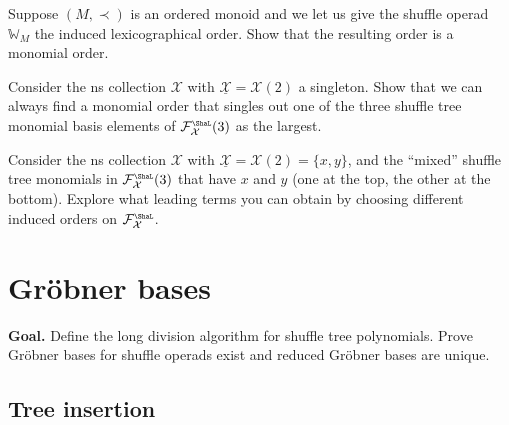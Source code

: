 \documentclass[fleqn, a4paper, twoside]{article}
\newcommand{\Sha}{{\scaleobj{0.75}{\ShaL}}}
\newcommand{\0}{\langle 0\rangle}
\newcommand{\XX}{\mathcal{X}}
\newcommand{\FF}{\mathcal{F}}
\DeclareRobustCommand{\[}{\begin{equation}}%
\DeclareRobustCommand{\]}{\end{equation}}%
\theoremstyle{mytheorem}
\theoremstyle{introthm}
\theoremstyle{mydefinition}
\theoremstyle{mydefinition2}
\theoremstyle{plain} %
\newcommand{\?}{\,?\,}
\theoremstyle{mytheorem}
\theoremstyle{plain} %
\newcommand\blankpage{%
    \null
    \thispagestyle{empty}%
    \newpage}
\begin{document}
\begin{question}\label{ex:orderedM}
Suppose $(M,\prec)$ is an ordered monoid and
we let us give the shuffle operad
$\mathbb{W}_M$ the induced lexicographical 
order. Show that the resulting order is a monomial
order.
\end{question}

\begin{question}
Consider the ns collection $\XX$ with $\underline{\XX} = \XX(2)$
a singleton. Show that we can always find a monomial order that
singles out one of the three shuffle tree monomial basis
elements of $\FF_\XX^\Sha(3)$ as the largest. 
\end{question}

\begin{question}
Consider the ns collection $\XX$ with $\underline{\XX} = \XX(2)
= \{x,y\}$, and the ``mixed'' shuffle tree monomials in 
$\FF_\XX^\Sha(3)$ that have $x$ and $y$ (one at the top,
the other at the bottom). Explore what leading terms
you can obtain by choosing different induced orders
on $\FF_\XX^\Sha$.
\end{question}

\afterpage{\blankpage}
 \pagebreak
 
\section{Gr\"obner bases}\label{lecture:GB1}

\textbf{Goal.} Define the long division algorithm for shuffle
tree polynomials. Prove Gr\"obner bases for shuffle operads exist
and reduced Gr\"obner bases are unique.

\subsection{Tree insertion}
\end{document}

